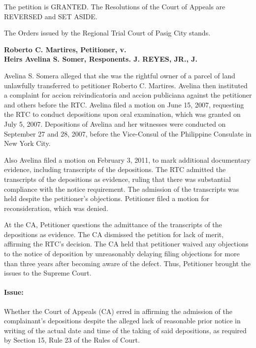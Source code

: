 \documentclass[
12pt,
oneside,
onehalfspacing,
headsepline
]{DigestCollection}
\begin{document}
The petition is GRANTED. The Resolutions of the Court of Appeals are REVERSED and SET ASIDE.

The Orders issued by the Regional Trial Court of Pasig City stands.

\label{11c125c0-0a10-11ef-932c-63c852f65e48}


\noindent\textbf{Roberto C. Martires, Petitioner, v. \\Heirs Avelina S. Somer, Responents. J. REYES, JR., J.}\vspace{0.4cm}

Avelina S. Somera alleged that she was the rightful owner of a parcel of land unlawfully transferred to petitioner Roberto C. Martires. Avelina then instituted a complaint for accion reivindicatoria and accion publiciana against the petitioner and others before the RTC. Avelina filed a motion on June 15, 2007, requesting the RTC to conduct depositions upon oral examination, which was granted on July 5, 2007. Depositions of Avelina and her witnesses were conducted on September 27 and 28, 2007, before the Vice-Consul of the Philippine Consulate in New York City.

Also Avelina filed a motion on February 3, 2011, to mark additional documentary evidence, including transcripts of the depositions. The RTC admitted the transcripts of the depositions as evidence, ruling that there was substantial compliance with the notice requirement. The admission of the transcripts was held despite the petitioner's objections. Petitioner filed a motion for reconsideration, which was denied. 

At the CA, Petitioner questions the admittance of the transcripts of the depositions as evidence. The CA dismissed the petition for lack of merit, affirming the RTC's decision. The CA held that petitioner waived any objections to the notice of deposition by unreasonably delaying filing objections for more than three years after becoming aware of the defect. Thus, Petitioner brought the issues to the Supreme Court.

\paragraph{Issue:}
\label{ec0aa070-09fd-11ef-932c-63c852f65e48}


Whether the Court of Appeals (CA) erred in affirming the admission of the complainant's depositions despite the alleged lack of reasonable prior notice in writing of the actual date and time of the taking of said depositions, as required by Section 15, Rule 23 of the Rules of Court.
\end{document}

